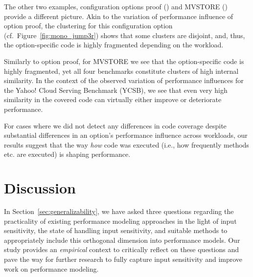 {{{The other two examples, configuration options \textsf{proof} (\zdrei) and \textsf{MVSTORE} (\htwo) provide a different picture. Akin to the variation of performance influence of option \textsf{proof}, the clustering for this configuration option (cf.~Figure~\ref{fig:mono_jump3r}) shows that some clusters are disjoint, and, thus, the option-specific code is highly fragmented depending on the workload. 

Similarly to option \textsf{proof}, for \textsf{MVSTORE} we see that the option-specific code is highly fragmented, yet all four benchmarks constitute clusters of high internal similarity. In the context of the observed variation of performance influences for the Yahoo! Cloud Serving Benchmark (YCSB), we see that even very high similarity in the covered code can virtually either improve or deteriorate performance.

For cases where we did not detect any differences in code coverage despite substantial differences in an option's performance influence across workloads, our results suggest that the way \emph{how} code was executed (i.e., how frequently methods etc. are executed) is shaping performance.

\vspace{1mm}

\section{Discussion}

In Section~\ref{sec:generalizability}, we have asked three questions regarding the practicality of existing performance modeling approaches in the light of input sensitivity, the state of handling input sensitivity, and suitable methods to appropriately include this orthogonal dimension into performance models. Our study provides an \textit{empirical} context to critically reflect on these questions and pave the way for further research to fully capture input sensitivity and improve work on performance modeling.


}}}
